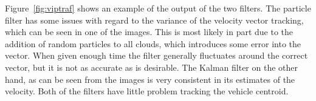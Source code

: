 \documentclass[conference]{IEEEtran}
\begin{document}
Figure~\ref{fig:viptraf} shows an example of the output of the two filters. The
particle filter has some issues with regard to the variance of the velocity
vector tracking, which can be seen in one of the images. This is most likely in
part due to the addition of random particles to all clouds, which introduces
some error into the vector. When given enough time the filter generally
fluctuates around the correct vector, but it is not as accurate as is
desirable. The Kalman filter on the other hand, as can be seen from the images
is very consistent in its estimates of the velocity. Both of the filters have
little problem tracking the vehicle centroid.

\begin{figure}
  \centering
  \\
\end{figure}
\end{document}
